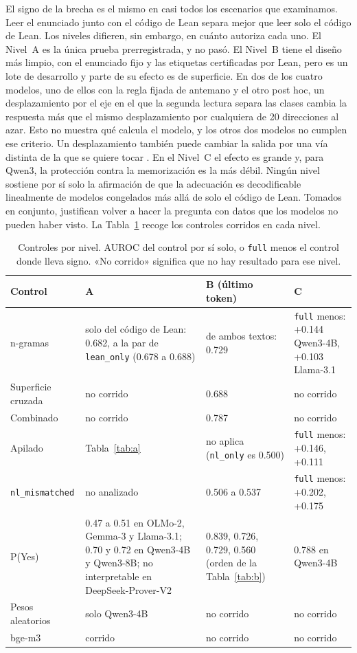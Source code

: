 \documentclass[10pt]{article}
\newcommand{\vr}[1]{\texttt{#1}}
\begin{document}
El signo de la brecha es el mismo en casi todos los escenarios que examinamos. Leer el enunciado junto con el código de Lean
separa mejor que leer solo el código de Lean. Los niveles difieren, sin embargo, en cuánto autoriza cada uno. El Nivel~A es
la única prueba prerregistrada, y no pasó. El Nivel~B tiene el diseño más limpio, con el enunciado fijo y las
etiquetas certificadas por Lean, pero es un lote de desarrollo y parte de su efecto es de superficie.
En dos de los cuatro modelos, uno de ellos con la regla fijada de antemano y el otro post hoc, un desplazamiento por el eje en el que la
segunda lectura separa las clases cambia la respuesta más que el mismo desplazamiento por cualquiera de 20 direcciones al azar. Esto no muestra qué calcula el modelo, y los otros dos modelos no cumplen ese criterio. Un desplazamiento también puede cambiar la salida
por una vía distinta de la que se quiere tocar \citep{makelov2024subspace}. En el Nivel~C
el efecto es grande y, para Qwen3, la protección contra la memorización es la más débil. Ningún nivel sostiene por
sí solo la afirmación de que la adecuación es decodificable linealmente de modelos congelados más allá de solo el código de Lean. Tomados en conjunto, justifican volver a hacer la pregunta con datos que los modelos no pueden haber visto.
La Tabla~\ref{tab:controlesnivel} recoge los controles corridos en cada nivel.

\begin{table}[h]
\centering
\caption{Controles por nivel. AUROC del control por sí solo, o \vr{full} menos el control donde lleva signo. «No corrido» significa que no hay resultado para ese nivel.}
\label{tab:controlesnivel}
\vspace{2pt}
{\small
\begin{tabularx}{\linewidth}{@{}lXXX@{}}
\toprule
Control & A & B (último token) & C\\
\midrule
n-gramas & solo del código de Lean: 0.682, a la par de \vr{lean\_only} (0.678 a 0.688) & de ambos textos: 0.729 & \vr{full} menos: +0.144 Qwen3-4B, +0.103 Llama-3.1\\
Superficie cruzada & no corrido & 0.688 & no corrido\\

Combinado & no corrido & 0.787 & no corrido\\
Apilado & Tabla~\ref{tab:a} & no aplica (\vr{nl\_only} es 0.500) & \vr{full} menos: +0.146, +0.111\\
\vr{nl\_mismatched} & no analizado & 0.506 a 0.537 & \vr{full} menos: +0.202, +0.175\\
P(Yes) & 0.47 a 0.51 en OLMo-2, Gemma-3 y Llama-3.1; 0.70 y 0.72 en Qwen3-4B y Qwen3-8B; no interpretable en DeepSeek-Prover-V2 & 0.839, 0.726, 0.729, 0.560 (orden de la Tabla~\ref{tab:b}) & 0.788 en Qwen3-4B\\
Pesos aleatorios & solo Qwen3-4B & no corrido & no corrido\\
bge-m3 & corrido & no corrido & no corrido\\
\bottomrule
\end{tabularx}}
\end{table}
\end{document}
